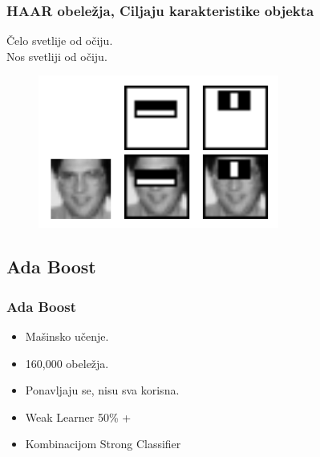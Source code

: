 \documentclass{beamer}
\begin{document}
\begin{frame}
  \frametitle{HAAR obeležja, Ciljaju karakteristike objekta}
  Čelo svetlije od očiju. \\
  Nos svetliji od očiju. \\
  \begin{figure}[H]
    \centering
    \includegraphics[width=0.7\linewidth]{../images/haar_features2}
  \end{figure}
\end{frame}


\subsection{Ada Boost}
\begin{frame}
  \frametitle{Ada Boost}

  \begin{itemize}
  \item<1-> Mašinsko učenje.
  \item<1-> 160,000 obeležja.
  \item<1-> Ponavljaju se, nisu sva korisna.
  \item<1-> Weak Learner 50\% +
  \item<1-> Kombinacijom Strong Classifier
  \end{itemize}

\end{frame}
\end{document}

